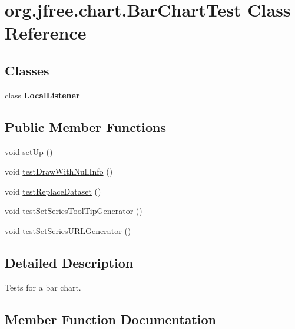 \hypertarget{classorg_1_1jfree_1_1chart_1_1_bar_chart_test}{}\section{org.\+jfree.\+chart.\+Bar\+Chart\+Test Class Reference}
\label{classorg_1_1jfree_1_1chart_1_1_bar_chart_test}
\subsection*{Classes}
\begin{DoxyCompactItemize}
\item 
class {\bfseries Local\+Listener}
\end{DoxyCompactItemize}
\subsection*{Public Member Functions}
\begin{DoxyCompactItemize}
\item 
void \mbox{\hyperlink{classorg_1_1jfree_1_1chart_1_1_bar_chart_test_ada161d5eeb12b9707a3f8a6d1a6e6355}{set\+Up}} ()
\item 
void \mbox{\hyperlink{classorg_1_1jfree_1_1chart_1_1_bar_chart_test_a996cb4701c00a90871122296d54632c1}{test\+Draw\+With\+Null\+Info}} ()
\item 
void \mbox{\hyperlink{classorg_1_1jfree_1_1chart_1_1_bar_chart_test_a2da4d90097ceaf355f66fe57ac9b386b}{test\+Replace\+Dataset}} ()
\item 
void \mbox{\hyperlink{classorg_1_1jfree_1_1chart_1_1_bar_chart_test_abb90ba031ff8ba226d48ae1813bedfce}{test\+Set\+Series\+Tool\+Tip\+Generator}} ()
\item 
void \mbox{\hyperlink{classorg_1_1jfree_1_1chart_1_1_bar_chart_test_afc653d2f2069c9ddb75a3d4bd41f2961}{test\+Set\+Series\+U\+R\+L\+Generator}} ()
\end{DoxyCompactItemize}


\subsection{Detailed Description}
Tests for a bar chart. 

\subsection{Member Function Documentation}
\mbox{\label{classorg_1_1jfree_1_1chart_1_1_bar_chart_test_ada161d5eeb12b9707a3f8a6d1a6e6355}} 
